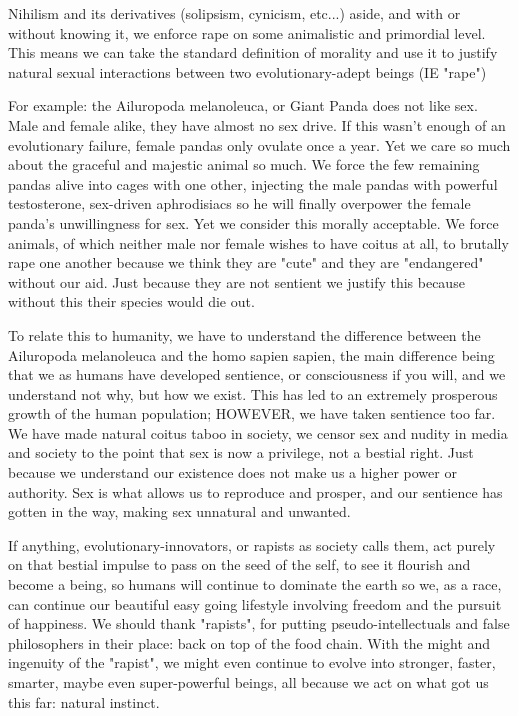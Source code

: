 Nihilism and its derivatives (solipsism, cynicism, etc...) aside, and with or 
without knowing it, we enforce rape on some animalistic and primordial level. 
This means we can take the standard definition of morality and use it to justify 
natural sexual interactions between two evolutionary-adept beings (IE "rape")


For example: the Ailuropoda melanoleuca, or Giant Panda does not like sex. Male 
and female alike, they have almost no sex drive. If this wasn't enough of an 
evolutionary failure, female pandas only ovulate once a year. Yet we care so 
much about the graceful and majestic animal so much. We force the few remaining 
pandas alive into cages with one other, injecting the male pandas with powerful 
testosterone, sex-driven aphrodisiacs so he will finally overpower the female 
panda's unwillingness for sex. Yet we consider this morally acceptable. We force 
animals, of which neither male nor female wishes to have coitus at all, to 
brutally rape one another because we think they are "cute" and they are 
"endangered" without our aid. Just because they are not sentient we justify this 
because without this their species would die out.


To relate this to humanity, we have to understand the difference between the 
Ailuropoda melanoleuca and the homo sapien sapien, the main difference being 
that we as humans have developed sentience, or consciousness if you will, and we 
understand not why, but how we exist. This has led to an extremely prosperous 
growth of the human population; HOWEVER, we have taken sentience too far. We 
have made natural coitus taboo in society, we censor sex and nudity in media and 
society to the point that sex is now a privilege, not a bestial right. Just 
because we understand our existence does not make us a higher power or 
authority. Sex is what allows us to reproduce and prosper, and our sentience has 
gotten in the way, making sex unnatural and unwanted.


If anything, evolutionary-innovators, or rapists as society calls them, act 
purely on that bestial impulse to pass on the seed of the self, to see it 
flourish and become a being, so humans will continue to dominate the earth so 
we, as a race, can continue our beautiful easy going lifestyle involving freedom 
and the pursuit of happiness. We should thank "rapists", for putting 
pseudo-intellectuals and false philosophers in their place: back on top of the 
food chain. With the might and ingenuity of the "rapist", we might even continue 
to evolve into stronger, faster, smarter, maybe even super-powerful beings, all 
because we act on what got us this far: natural instinct.


